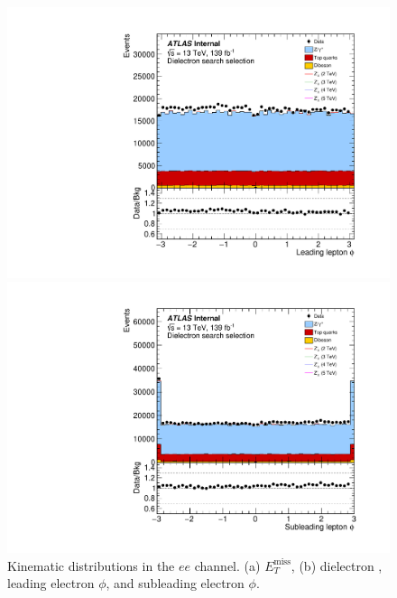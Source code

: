 \begin{figure}[h!]
\begin{minipage}[b]{.45\linewidth}
    \includegraphics[width=1\textwidth]{figures/ci/dataMc/stacks_mc16e_2015-2018_ee_phi1.pdf}
    \subcaption{}
\end{minipage}
\begin{minipage}[b]{.45\linewidth}
    \includegraphics[width=1\textwidth]{figures/ci/dataMc/stacks_mc16e_2015-2018_ee_phi2.pdf}
    \subcaption{}
\end{minipage}
\caption{Kinematic distributions in the $ee$ channel. (a) $E_T^\text{miss}$, (b) dielectron \pt, leading electron $\phi$, and subleading electron $\phi$.}
\label{fig:}
\end{figure}

